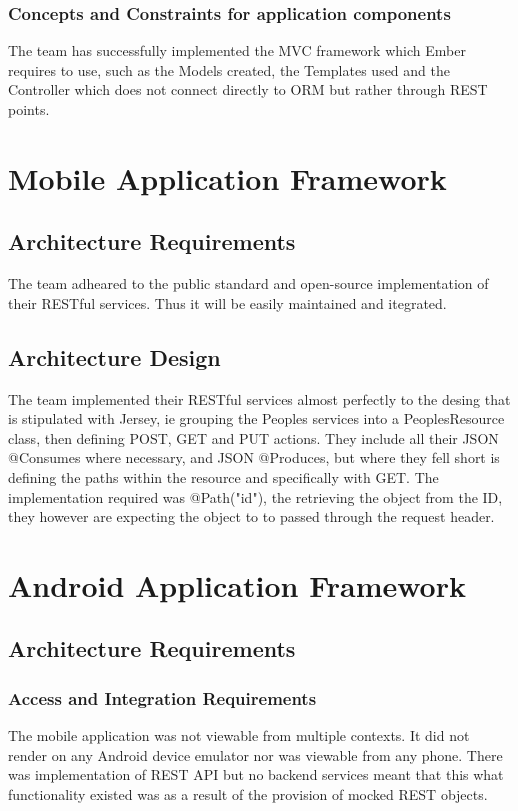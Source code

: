 \documentclass[a4paper,10pt]{article}
\begin{document}
    \subsubsection{Concepts and Constraints for application components}
      The team has successfully implemented the MVC framework which Ember requires to use, such as the Models created, the Templates used and the Controller which does not connect directly to ORM but rather through REST points.

\section{Mobile Application Framework}
  \subsection{Architecture Requirements}
    The team adheared to the public standard and open-source implementation of their RESTful services. Thus it will be easily maintained and itegrated.
  \subsection{Architecture Design}
    The team implemented their RESTful services almost perfectly to the desing that is stipulated with Jersey, ie grouping the Peoples services into a PeoplesResource class, then defining POST, GET and PUT actions. They include all their JSON @Consumes where necessary, and JSON @Produces, but where they fell short is defining the paths within the resource and specifically with GET. The implementation required was @Path("{id}"), the retrieving the object from the ID, they however are expecting the object to to passed through the request header.


\section{Android Application Framework}
  \subsection{Architecture Requirements}
    \subsubsection{Access and Integration Requirements}
  	The mobile application was not viewable from multiple contexts. It did not render on any Android device  emulator nor was viewable from any phone. There was implementation of REST API but no backend services meant that this what functionality existed was as a result of the provision of mocked REST objects. 
\end{document}
